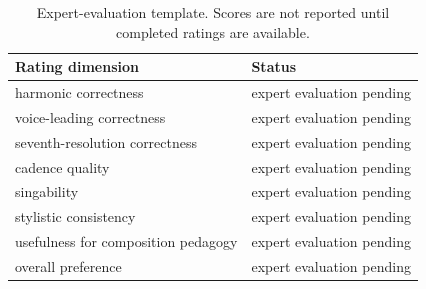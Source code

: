 \begin{table}[t]
\centering
\caption{Expert-evaluation template. Scores are not reported until completed ratings are available.}
\begin{tabular}{ll}
\toprule
Rating dimension & Status \\
\midrule
harmonic correctness & expert evaluation pending \\
voice-leading correctness & expert evaluation pending \\
seventh-resolution correctness & expert evaluation pending \\
cadence quality & expert evaluation pending \\
singability & expert evaluation pending \\
stylistic consistency & expert evaluation pending \\
usefulness for composition pedagogy & expert evaluation pending \\
overall preference & expert evaluation pending \\
\bottomrule
\end{tabular}
\end{table}
